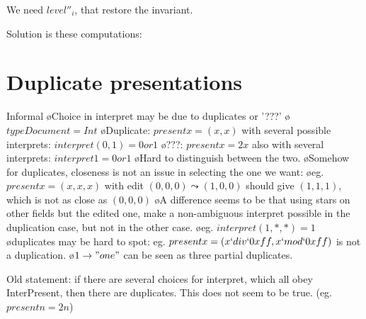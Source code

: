 We need $level''_i$,   that restore the invariant.



Solution is these computations: 

\ec


%																
%																
%																
\section{Duplicate presentations}

Informal
\bl
\o Choice in interpret may be due to duplicates or '???'
\o $type Document = Int$ 
\o Duplicate: $present x = (x,x)$ with several possible interprets: $interpret (0,1) = 0 or 1$ 
\o ???: $present x = 2x$ also with several interprets: $interpret 1 = 0 or 1$ 
\o Hard to distinguish between the two.
\o Somehow for duplicates, closeness is not an issue in selecting the one we want:
\o eg. $present x = (x,x,x)$ with edit $(0,0,0)\leadsto(1,0,0)$ should give $(1,1,1)$, which is not as close as $(0,0,0)$
\o A difference seems to be that using stars on other fields but the edited one, make a non-ambiguous interpret possible in the duplication case, but not in the other case.
\o eg. $interpret (1,*,*) = 1$
\o duplicates may be hard to spot: eg. $present x = (x `div` 0xff, x `mod` 0xff)$ is not a duplication.
\o $1 \to "one"$ can be seen as three partial duplicates. 
\el

Old statement: if there are several choices for interpret, which all obey {\sc InterPresent}, then there are duplicates. This does not seem to be true. (eg. $present n = 2n$)

